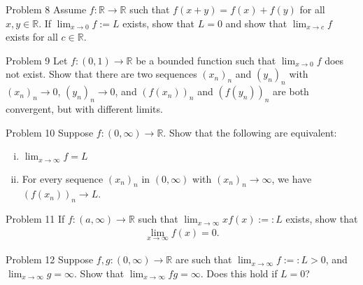 \documentclass[10pt]{extarticle}
\newcommand{\R}{\mathbb{R}}
\begin{document}
  \begin{problem}{Problem 8}
    Assume $f:\R\rightarrow \R$ such that $f(x+y) = f(x) + f(y)$ for all $x,y\in\R$. If $\lim_{x\rightarrow 0}f := L$ exists, show that $L = 0$ and show that $\lim_{x\rightarrow c}f$ exists for all $c\in\R$.
  \end{problem}
  \begin{problem}{Problem 9}
    Let $f:(0,1) \rightarrow \R$ be a bounded function such that $\lim_{x\rightarrow 0} f$ does not exist. Show that there are two sequences $(x_n)_n$ and $(y_n)_n$ with $(x_n)_n \rightarrow 0$, $(y_n)_n \rightarrow 0$, and $(f(x_n))_n$ and $(f(y_n))_n$ are both convergent, but with different limits.
  \end{problem}
  \begin{problem}{Problem 10}
    Suppose $f:(0,\infty) \rightarrow \R$. Show that the following are equivalent:
    \begin{enumerate}[(i)]
      \item $\displaystyle\lim_{x\rightarrow\infty} f = L$
      \item For every sequence $(x_n)_n$ in $(0,\infty)$ with $(x_n)_n \rightarrow \infty$, we have $(f(x_n))_n \rightarrow L$.
    \end{enumerate}
  \end{problem}
  \begin{problem}{Problem 11}
    If $f:(a,\infty) \rightarrow \R$ such that $\lim_{x\rightarrow\infty}xf(x) :=: L$ exists, show that
    \begin{align*}
      \lim_{x\rightarrow\infty}f(x) = 0.
    \end{align*}
  \end{problem}
  \begin{problem}{Problem 12}
    Suppose $f,g:(0,\infty)\rightarrow \R$ are such that $\lim_{x\rightarrow\infty} f:=: L > 0$, and $\lim_{x\rightarrow \infty}g = \infty$. Show that $\lim_{x\rightarrow \infty}fg = \infty$. Does this hold if $L = 0$?
  \end{problem}
\end{document}
